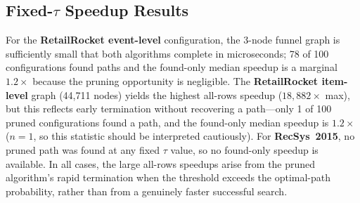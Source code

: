 \subsection{Fixed-\texorpdfstring{$\tau$}{tau} Speedup Results}

\begin{table}[htbp]
\centering
\renewcommand{\arraystretch}{1.3}
\caption[Fixed-$\tau$ real-data speedup]{Fixed-$\tau$ speedup on real-world datasets. ``All'' speedups include rows where the pruned algorithm terminated without finding a path; ``found'' is restricted to path-found rows.}
\label{table:real_data_speedup}
\end{table}

For the \textbf{RetailRocket event-level} configuration, the 3-node funnel graph is sufficiently small that both algorithms complete in microseconds; 78 of 100 configurations found paths and the found-only median speedup is a marginal $1.2\times$ because the pruning opportunity is negligible. The \textbf{RetailRocket item-level} graph (44,711 nodes) yields the highest all-rows speedup ($18{,}882\times$ max), but this reflects early termination without recovering a path---only 1 of 100 pruned configurations found a path, and the found-only median speedup is $1.2\times$ ($n=1$, so this statistic should be interpreted cautiously). For \textbf{RecSys~2015}, no pruned path was found at any fixed $\tau$ value, so no found-only speedup is available. In all cases, the large all-rows speedups arise from the pruned algorithm's rapid termination when the threshold exceeds the optimal-path probability, rather than from a genuinely faster successful search.

